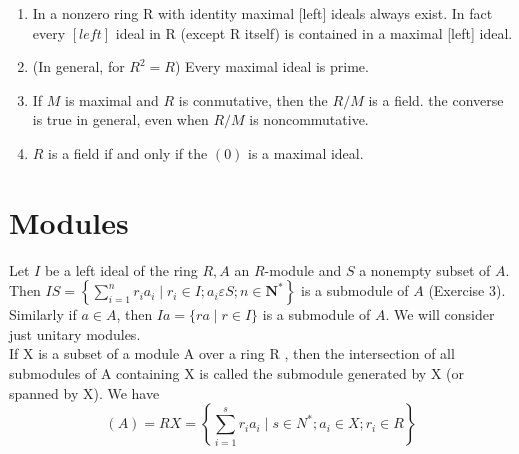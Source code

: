 \begin{theo}
    \begin{enumerate}
        \item In a nonzero ring R with identity maximal [left] ideals always exist. In fact every $[l e f t]$ ideal in R (except R itself) is contained in a maximal [left] ideal.
        \item (In general, for $R^2 = R$) Every maximal ideal is prime. 
        \item If $M$ is maximal and $R$ is conmutative, then the $R/M$ is a field. the converse is true in general, even when $R/M$ is noncommutative.
        \item $R$ is a field if and only if the $(0)$ is a maximal ideal.
    \end{enumerate}
\end{theo}






\section{Modules}

Let $I$ be a left ideal of the ring $R, A$ an $R$-module and $S$ a nonempty subset of $A$. Then $I S=\left\{\sum_{i=1}^n r_i a_i \mid r_i \in I ; a_i \varepsilon S ; n \in \mathbf{N}^*\right\}$ is a submodule of $A$ (Exercise 3). Similarly if $a \in A$, then $I a=\{r a \mid r \in I\}$ is a submodule of $A$. We will consider just unitary modules.\\

If X is a subset of a module A over a ring R , then the intersection of all submodules of A containing X is called the submodule generated by X (or spanned by X). We have $$(A)=R X=\left\{\sum_{i=1}^s r_i a_i \mid s \in N^* ; a_i \in X ; r_i \in R\right\}$$

